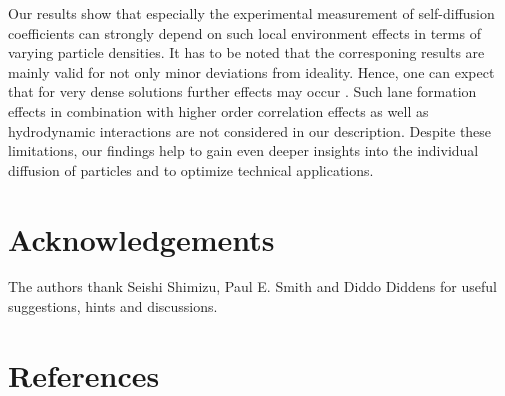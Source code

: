 \documentclass[aip,jcp,reprint]{revtex4-1}
\begin{document}
Our results show that especially the experimental measurement of self-diffusion coefficients can strongly depend on such local environment effects in terms of varying particle densities. It has to be noted that the corresponing results are mainly valid for not only minor deviations from ideality. Hence, one can expect that for very dense solutions further effects may occur \cite{rex08a}. Such lane formation effects in combination with higher order correlation effects as well as hydrodynamic interactions are not considered in our description. Despite these limitations, our findings help to gain even deeper insights into the individual diffusion of particles and to optimize technical applications.

\section{Acknowledgements}
The authors thank Seishi Shimizu, Paul E. Smith and Diddo Diddens for useful suggestions, hints and discussions. 

\section*{References}


\end{document}
